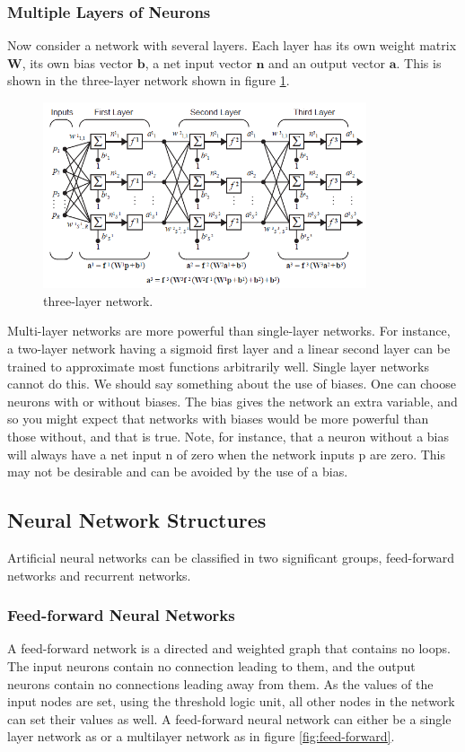 \documentclass[12pt, a4paper, twoside]{report}
\begin{document}
\subsubsection{Multiple Layers of Neurons}
Now consider a network with several layers. Each layer has its own weight matrix $\mathbf{W}$, its own bias vector $\mathbf{b}$, a net input vector $\mathbf{n}$ and an output vector $\mathbf{a}$. This is shown in the three-layer network shown in figure \ref{fig:three_layer_network}.
\begin{figure}[!h]
	\centering
	\includegraphics[width=0.85\textwidth]
	{images/chapter4/three_layer_network}
	\caption{three-layer network.}
	\label{fig:three_layer_network}
\end{figure}

Multi-layer networks are more powerful than single-layer networks. For instance, a two-layer network having a sigmoid first layer and a linear second layer can be trained to approximate most functions arbitrarily well. Single layer networks cannot do this. We should say something about the use of biases. One can choose neurons with or without biases. The bias gives the network an extra variable, and so you might expect that networks with biases would be more powerful than those without, and that is true. Note, for instance, that a neuron without a bias will always have a net input n of zero when the network inputs p are zero. This may not be desirable and can be avoided by the use of a bias.

\subsection{Neural Network Structures}
Artificial neural networks can be classified in two significant groups, feed-forward networks and recurrent networks.
\subsubsection{Feed-forward Neural Networks}
A feed-forward network is a directed and weighted graph that contains no loops. The input neurons contain no connection leading to them, and the output neurons contain no connections leading away from them. As the values of the input nodes are set, using the threshold logic unit, all other nodes in the network can set their values as well. A feed-forward neural network can either be a single layer network as or a multilayer network as in figure \ref{fig:feed-forward}.
\end{document}
